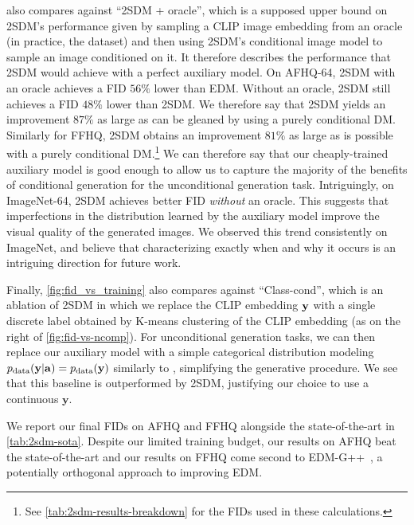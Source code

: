 also compares against ``2SDM + oracle'', which is a supposed upper bound on 2SDM's performance given by sampling a CLIP image embedding from an oracle (in practice, the dataset) and then using 2SDM's conditional image model to sample an image conditioned on it. It therefore describes the performance that 2SDM would achieve with a perfect auxiliary model. On AFHQ-64, 2SDM with an oracle achieves a FID $56\%$ lower than EDM. Without an oracle, 2SDM still achieves a FID $48\%$ lower than 2SDM. We therefore say that 2SDM yields an improvement $87\%$ as large as can be gleaned by using a purely conditional DM. Similarly for FFHQ, 2SDM obtains an improvement $81\%$ as large as is possible with a purely conditional DM.\footnote{See \cref{tab:2sdm-results-breakdown} for the FIDs used in these calculations.} We can therefore say that our cheaply-trained auxiliary model is good enough to allow us to capture the majority of the benefits of conditional generation for the unconditional generation task. Intriguingly,
 on ImageNet-64, 2SDM achieves better FID \textit{without} an oracle. This suggests that imperfections in the distribution
learned by the auxiliary model improve the visual quality of the generated images. We observed this trend consistently on ImageNet, and believe that characterizing exactly when and why it occurs is an intriguing direction for future work.

Finally, \cref{fig:fid_vs_training} also compares against ``Class-cond'', which is an ablation of 2SDM in which we replace the CLIP embedding ${\mathbf{y}}$ with a single discrete label obtained by K-means clustering of the CLIP embedding (as on the right of \cref{fig:fid-vs-ncomp}). For unconditional generation tasks, we can then replace our auxiliary model with a simple categorical distribution modeling $p_{\rm{data}}({\mathbf{y}}|{\mathbf{a}})=p_{\rm{data}}({\mathbf{y}})$ similarly to \citet{hu2022self}, simplifying the generative procedure. We see that this baseline is outperformed by 2SDM, justifying our choice to use a continuous $\mathbf{y}$.

We report our final FIDs on AFHQ and FFHQ alongside the state-of-the-art in \cref{tab:2sdm-sota}. Despite our limited training budget, our results on AFHQ beat the state-of-the-art and our results on FFHQ come second to EDM-G++~\citep{kim2022refining}, a potentially orthogonal approach to improving EDM.

